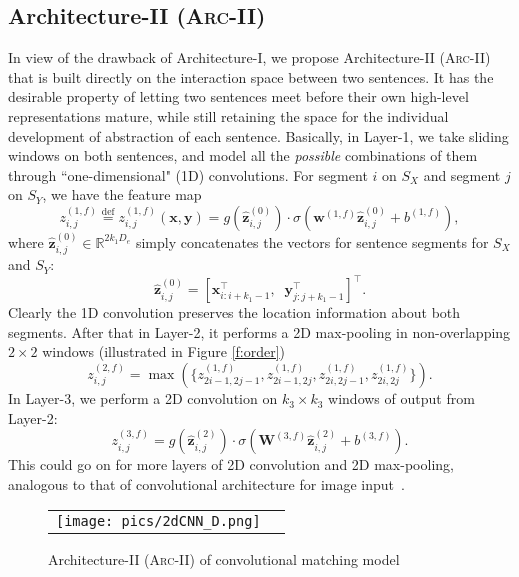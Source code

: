\documentclass{article} \usepackage{nips14submit_e,times}
\newcommand{\w}{\ensuremath{\mathbf{w}}}
\newcommand{\x}{\ensuremath{\mathbf{x}}}
\newcommand{\y}{\ensuremath{\mathbf{y}}}
\newcommand{\0}{\ensuremath{\mathbf{0}}}
\newcommand{\1}{\ensuremath{\mathbf{1}}}
\begin{document}
\subsection{Architecture-II (\textsc{Arc-II})}  \vspace{-10pt}
In view of the drawback of Architecture-I, we propose Architecture-II (\textsc{Arc-II}) that is built directly on the interaction space between two sentences. It has the desirable property of letting two sentences meet before their own high-level representations mature, while still retaining the space for the individual development of abstraction of each sentence. Basically, in Layer-1, we take sliding windows on both sentences, and model all the \emph{possible} combinations of them through ``one-dimensional"  (1D) convolutions. For segment $i$ on $S_X$ and segment $j$ on $S_Y$, we have the feature map
\begin{equation}
z^{(1, f)}_{i,j} \overset{\text{def}}{=}
z^{(1,f)}_{i,j}(\x,\y) =  g(\hat{\mathbf{z}}^{(0)}_{i,j})\cdot \sigma(\w^{(1,f)} \hat{\mathbf{z}}^{(0)}_{i,j} + b^{(1,f)}),
\end{equation}
where $\hat{\mathbf{z}}^{(0)}_{i,j} \in \mathbb{R}^{2k_1 D_{e}}$ simply concatenates the vectors for sentence segments for $S_X$ and $S_Y$:
\[
\hat{\mathbf{z}}^{(0)}_{i,j} =  [\x_{i:i+k_1-1}^\top,\;\; \y_{j:j+k_1-1}^\top]^\top.
\]
Clearly the 1D convolution preserves the location information about both segments. After that in Layer-2, it performs a 2D max-pooling in non-overlapping $2\times 2$ windows (illustrated in Figure \ref{f:order})
\begin{equation}
z_{i,j}^{(2,f)} = \max(\{z_{2i-1,2j-1}^{(1,f)}, z_{2i-1,2j}^{(1,f)},z_{2i,2j-1}^{(1,f)},z_{2i,2j}^{(1,f)}\}). \label{e:2dpool}
\end{equation}
In Layer-3, we perform a 2D convolution on $k_3\times k_3$ windows of output from Layer-2:
\begin{equation}
z^{(3, f)}_{i,j} =  g(\hat{\mathbf{z}}^{(2)}_{i,j})\cdot \sigma(\mathbf{W}^{(3,f)} \hat{\mathbf{z}}^{(2)}_{i,j} + b^{(3,f)}).
\end{equation}
This could go on for more layers of 2D convolution and 2D max-pooling, analogous to that of convolutional architecture for image input~\cite{cnn}.

\begin{figure}[h!]
\begin{center}
    \begin{tabular}[c]{cc}
      \texttt{[image: pics/2dCNN\_D.png]}
\end{tabular}
    \caption{Architecture-II (\textsc{Arc-II}) of convolutional matching model}
    \label{f:2DCNN}
  \end{center} \vspace{-10pt}
\end{figure}
\end{document}
